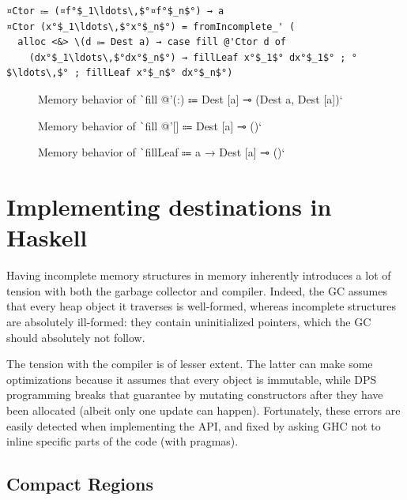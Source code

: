 \documentclass[english]{jflart}
\def\figscale{1.145}
\newlength{\currentparskip}
\newenvironment{unbreakable}
{%
  \setlength{\currentparskip}{\parskip}%
  \setlength{\parskip}{\currentparskip}%
  \par\vspace{0.5\baselineskip}%
  \noindent\begin{minipage}{\textwidth}%
    \setlength{\parskip}{\currentparskip}%
}
{%
  \end{minipage}%
  \par\vspace{0.5\baselineskip}%
}
\begin{document}
\begin{unbreakable}
{\small
\begin{verbatim}
¤Ctor ⩴ (¤f°$_1\ldots\,$°¤f°$_n$°) → a
¤Ctor (x°$_1\ldots\,$°x°$_n$°) = fromIncomplete_' (
  alloc <&> \(d ⩴ Dest a) → case fill @'Ctor d of
    (dx°$_1\ldots\,$°dx°$_n$°) → fillLeaf x°$_1$° dx°$_1$° ; °$\ldots\,$° ; fillLeaf x°$_n$° dx°$_n$°)
\end{verbatim}
}
\end{unbreakable}

\begin{figure}[t]\centering
  \scalebox{\figscale}{\tikzfig{fillCons}}
  \caption{Memory behavior of \texttt`fill @'(:) ⩴ Dest [a] ⊸ (Dest a, Dest [a])`}
  \label{fig:schema-fillCons}

  \scalebox{\figscale}{\tikzfig{fillNil}}
  \caption{Memory behavior of \texttt`fill @'[] ⩴ Dest [a] ⊸ ()`}
  \label{fig:schema-fillNil}

  \scalebox{\figscale}{\tikzfig{fillLeaf}}
  \caption{Memory behavior of \texttt`fillLeaf ⩴ a → Dest [a] ⊸ ()`}
  \label{fig:schema-fillLeaf}
\end{figure}

\section{Implementing destinations in Haskell}\label{sec:implementation}

Having incomplete memory structures in memory inherently introduces a lot of tension with both the garbage collector and compiler. Indeed, the GC assumes that every heap object it traverses is well-formed, whereas incomplete structures are absolutely ill-formed: they contain uninitialized pointers, which the GC should absolutely not follow.

The tension with the compiler is of lesser extent. The latter can make some optimizations because it assumes that every object is immutable, while DPS programming breaks that guarantee by mutating constructors after they have been allocated (albeit only one update can happen). Fortunately, these errors are easily detected when implementing the API, and fixed by asking GHC not to inline specific parts of the code (with pragmas).

\subsection{Compact Regions}\label{ssec:impl-compact-regions}
\end{document}
